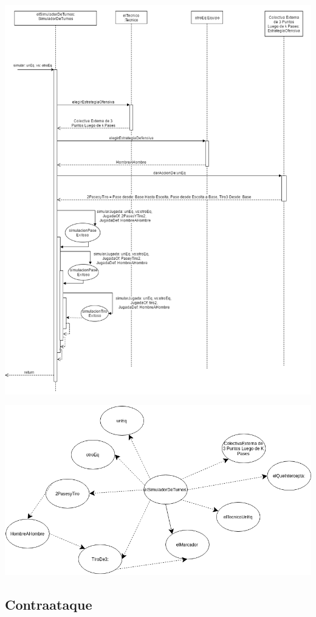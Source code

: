 \includegraphics[width=\textwidth]{imgs/colectivaExternaDe3Secuencia.png}

\includegraphics[width=\textwidth]{imgs/colectivaExternaDe3Objetos.png}

\subsection{Contraataque}

